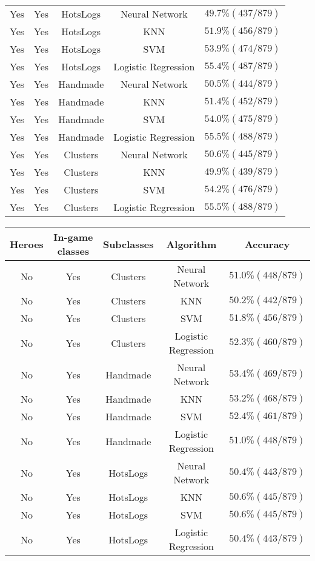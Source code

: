 \documentclass[11pt,letterpaper]{article}
\begin{document}
\begin{tabular}{c|c|c|c|c}
Yes & Yes & HotsLogs & Neural Network & $49.7\% (437/879)$ \\
Yes & Yes & HotsLogs & KNN & $51.9\% (456/879)$ \\
Yes & Yes & HotsLogs & SVM & $53.9\% (474/879)$ \\
Yes & Yes & HotsLogs & Logistic Regression & $55.4\% (487/879)$ \\

Yes & Yes & Handmade & Neural Network & $50.5\% (444/879)$ \\
Yes & Yes & Handmade & KNN & $51.4\% (452/879)$ \\
Yes & Yes & Handmade & SVM & $54.0\% (475/879)$ \\
Yes & Yes & Handmade & Logistic Regression & $55.5\% (488/879)$ \\

Yes & Yes & Clusters & Neural Network & $50.6\% (445/879)$ \\
Yes & Yes &  Clusters & KNN & $49.9\% (439/879)$ \\
Yes & Yes &  Clusters & SVM & $54.2\% (476/879)$ \\
Yes & Yes &  Clusters & Logistic Regression & $55.5\% (488/879)$ \\
\end{tabular}
\noindent\begin{tabular}{c|c|c|c|c}
\textbf{Heroes} & \textbf{In-game classes} & \textbf{Subclasses} & \textbf{Algorithm} & \textbf{Accuracy} \\
\hline




No & Yes & Clusters & Neural Network & $51.0\% (448/879)$ \\
No & Yes & Clusters & KNN & $50.2\% (442/879)$ \\
No & Yes &Clusters& SVM & $51.8\% (456/879)$ \\
No & Yes & Clusters & Logistic Regression & $52.3\% (460/879)$ \\

No & Yes & Handmade & Neural Network & $53.4\% (469/879)$ \\
No & Yes & Handmade & KNN & $53.2\% (468/879)$ \\
No & Yes & Handmade & SVM & $52.4\% (461/879)$ \\
No & Yes & Handmade & Logistic Regression & $51.0\% (448/879)$ \\

No & Yes & HotsLogs & Neural Network & $50.4\% (443/879)$ \\
No & Yes & HotsLogs & KNN & $50.6\% (445/879)$ \\
No & Yes & HotsLogs & SVM & $50.6\% (445/879)$ \\
No & Yes & HotsLogs & Logistic Regression & $50.4\% (443/879)$ \\
\end{tabular}
\end{document}
